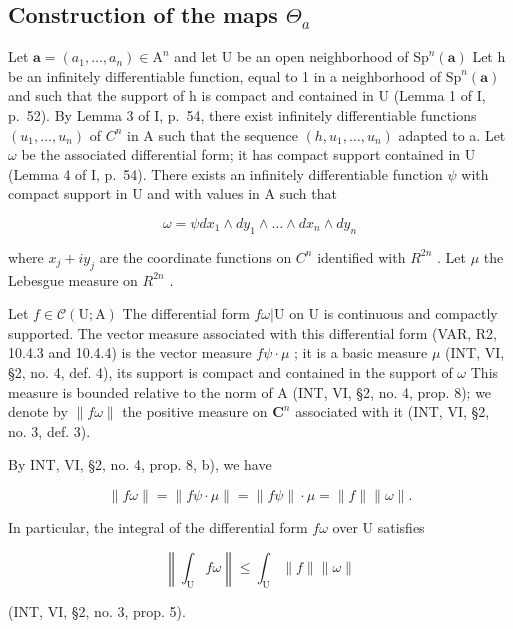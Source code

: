 \subsection{\texorpdfstring{Construction of the maps \(\Theta_{a}\)}{Construction of the maps \textbackslash Theta\_\{a\}}}

Let \(\boldsymbol{a}=(a_{1},\ldots,a_{n})\in\mathrm{A}^{n}\) and let U be an open neighborhood of \(\mathrm{Sp}^{n}(\boldsymbol{a})\) Let h be an infinitely differentiable function, equal to 1 in a neighborhood of \(\mathrm{Sp}^{n}(\boldsymbol{a})\) and such that the support of h is compact and contained in U (Lemma 1 of I, p.~52). By Lemma 3 of I, p.~54, there exist infinitely differentiable functions \((u_{1},\ldots,u_{n})\) of \(C^{n}\) in A such that the sequence \((h,u_{1},\ldots,u_{n})\) adapted to a. Let \(\omega\) be the associated differential form; it has compact support contained in U (Lemma 4 of I, p.~54). There exists an infinitely differentiable function \(\psi\) with compact support in U and with values in A such that

\[
\omega = \psi d x _ {1} \wedge d y _ {1} \wedge \dots \wedge d x _ {n} \wedge d y _ {n}
\]

where \(x_{j} + iy_{j}\) are the coordinate functions on \(C^{n}\) identified with \(R^{2n}\) . Let \(\mu\) the Lebesgue measure on \(R^{2n}\) .

Let \(f \in \mathcal{C}(\mathrm{U};\mathrm{A})\) The differential form \(f\omega|\mathrm{U}\) on \(\mathrm{U}\) is continuous and compactly supported. The vector measure associated with this differential form (VAR, R2, 10.4.3 and 10.4.4) is the vector measure \(f\psi \cdot \mu\) ; it is a basic measure \(\mu\) (INT, VI, §2, no. 4, def. 4), its support is compact and contained in the support of \(\omega\) This measure is bounded relative to the norm of A (INT, VI, §2, no. 4, prop. 8); we denote by \(\| f\omega\|\) the positive measure on \(\mathbf{C}^n\) associated with it (INT, VI, §2, no. 3, def. 3).

By INT, VI, §2, no. 4, prop. 8, b), we have

\[
\| f \omega \| = \| f \psi \cdot \mu \| = \| f \psi \| \cdot \mu = \| f \| \| \omega \|.
\]

In particular, the integral of the differential form \(f\omega\) over U satisfies

\[
\left\| \int_ {\mathrm{U}} f \omega \right\| \leqslant \int_ {\mathrm{U}} \| f \| \| \omega \|
\]

(INT, VI, §2, no. 3, prop. 5).

